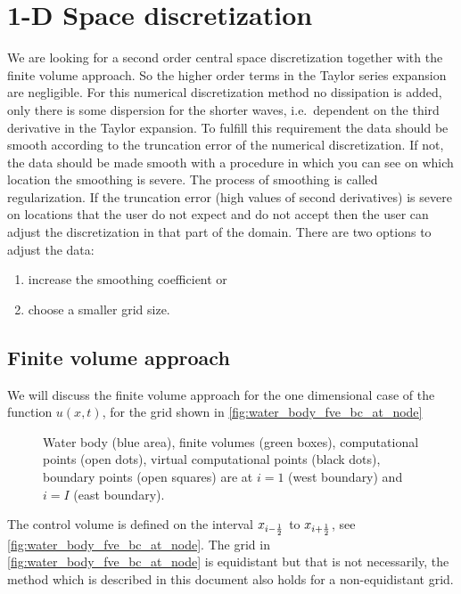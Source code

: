 \chapter{1-D Space discretization}\label{sec:1d_space_discretization}
We are looking for a second order central space discretization together with the finite volume approach.
So the higher order terms in the Taylor series expansion are negligible.
For this numerical discretization method no dissipation is added, only there is some dispersion for the shorter waves, i.e.\ dependent on the third derivative in the Taylor expansion.
To fulfill this requirement the data should be smooth according to the truncation error of the numerical discretization.
If not, the data should be made smooth with a procedure in which you can see on which location the smoothing is severe.
The process of smoothing is called regularization.
If the truncation error (high values of second derivatives) is severe on locations that the user do not expect and do not accept then the user can adjust the discretization in that part of the domain.
%
There are two options to adjust the data:
\begin{enumerate}
    \item increase the smoothing coefficient or
    \item choose a smaller grid size.
\end{enumerate}

\section{Finite volume approach}
We will discuss the finite volume approach for the one dimensional case of the function $u(x,t)$,
for the grid shown in  \autoref{fig:water_body_fve_bc_at_node}
\begin{figure}[H]
    \centering
    \begin{center}
    \resizebox{0.8\textwidth}{!}{
        
    }
\end{center}
    \caption{Water body (blue area), finite volumes (green boxes), computational points (open dots), virtual computational points (black dots), boundary points (open squares) are at $i=1$ (west boundary) and $i=I$ (east boundary).}\label{fig:water_body_fve_bc_at_node}
\end{figure}
The control volume is defined on the interval $x_{i-\frac{1}{2}}$ to $x_{i+\frac{1}{2}}$, see \autoref{fig:water_body_fve_bc_at_node}.
The grid in \autoref{fig:water_body_fve_bc_at_node} is equidistant but that is not necessarily, the method which is described in this document also holds for a non-equidistant grid.

